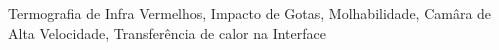 \begin{palavraschave}
Termografia de Infra Vermelhos, Impacto de Gotas, Molhabilidade, Camâra de Alta Velocidade, Transferência de calor na Interface
\end{palavraschave}
\clearpage
\thispagestyle{empty}
\cleardoublepage